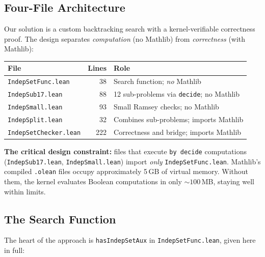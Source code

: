 \documentclass[11pt]{article}
\newcommand{\lean}[1]{\texttt{#1}}
\begin{document}
\subsection{Four-File Architecture}
\label{sec:checker:arch}

Our solution is a custom backtracking search with a kernel-verifiable
correctness proof.
The design separates \emph{computation} (no Mathlib) from
\emph{correctness} (with Mathlib):

\begin{center}
\begin{tabular}{lrl}
\toprule
File & Lines & Role \\
\midrule
\texttt{IndepSetFunc.lean}    & 38  & Search function; \emph{no} Mathlib \\
\texttt{IndepSub17.lean}      & 88  & 12 sub-problems via \lean{decide}; no Mathlib \\
\texttt{IndepSmall.lean}      & 93  & Small Ramsey checks; no Mathlib \\
\texttt{IndepSplit.lean}      & 32  & Combines sub-problems; imports Mathlib \\
\texttt{IndepSetChecker.lean} & 222 & Correctness and bridge; imports Mathlib \\
\bottomrule
\end{tabular}
\end{center}

\medskip\noindent
\textbf{The critical design constraint:}
files that execute \lean{by decide} computations (\texttt{IndepSub17.lean},
\texttt{IndepSmall.lean}) import \emph{only} \texttt{IndepSetFunc.lean}.
Mathlib's compiled \texttt{.olean} files occupy approximately 5\,GB of virtual memory.
Without them, the kernel evaluates Boolean computations in only $\sim\!100$\,MB,
staying well within limits.

\subsection{The Search Function}
\label{sec:checker:func}

The heart of the approach is \lean{hasIndepSetAux} in \texttt{IndepSetFunc.lean},
given here in full:
\end{document}
